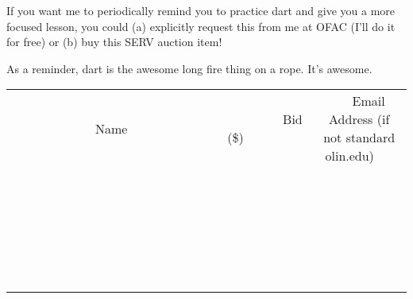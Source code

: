 \documentclass[11pt]{article}
\begin{document}
If you want me to periodically remind you to practice dart and give you a more focused lesson, you could (a) explicitly request this from me at OFAC (I'll do it for free) or (b) buy this SERV auction item!

As a reminder, dart is the awesome long fire thing on a rope. It's awesome.
\\[6ex]
\begin{tabular}{c c c}
~~~~~~~~~~~~~Name~~~~~~~~~~~~~ & ~~~~~~~~~Bid (\$)~~~~~~~~~  & ~~~Email Address (if not standard olin.edu)~~~\\
 & & \\
\hline
 & & \\
\hline
 & & \\
\hline
 & & \\
\hline
 & & \\
\hline
 & & \\
\hline
 & & \\
\hline
 & & \\
\hline
 & & \\
\hline
 & & \\
\hline
 & & \\
\hline
 & & \\
\hline
 & & \\
\hline
 & & \\
\hline
 & & \\
\hline
 & & \\
\hline
 & & \\
\hline
 & & \\
\hline
 & & \\
\hline
 & & \\
\hline
 & & \\
\hline
 & & \\
\hline
 & & \\
\hline
 & & \\
\hline
 & & \\
\hline
 & & \\
\hline
\end{tabular}
\newpage
\end{document}
